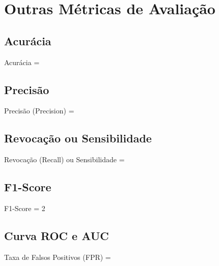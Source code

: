 \section{Outras Métricas de Avaliação}

\subsection{Acurácia}

\begin{equacaodestaque}{Acurácia}
     = 
    \label{eq:acuracia}
\end{equacaodestaque}

\subsection{Precisão}

\begin{equacaodestaque}{Precisão (Precision)}
     = 
    \label{eq:precisao}
\end{equacaodestaque}

\subsection{Revocação ou Sensibilidade}

\begin{equacaodestaque}{Revocação (Recall) ou Sensibilidade}
     = 
    \label{eq:revocacao}
\end{equacaodestaque}

\subsection{F1-Score}

\begin{equacaodestaque}{F1-Score}
     = 2 \times {}
    \label{eq:f1_score}
\end{equacaodestaque}

\subsection{Curva ROC e AUC}

\begin{equacaodestaque}{Taxa de Falsos Positivos (FPR)}
     = 
    \label{eq:fpr}
\end{equacaodestaque}

